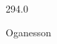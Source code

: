 \documentclass[12pt]{article}
\begin{document}
\hfill{}
\vfill
\begin{center}
  {\fontsize{50}{60}
  }

  294.0

Oganesson
\end{center}
\vfill
\end{document}

